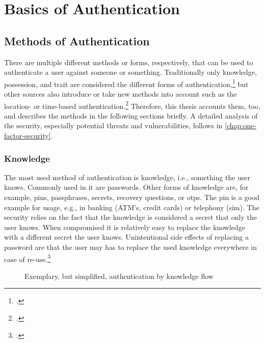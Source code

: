 \chapter{Basics of Authentication}
\label{chapter:basics}

\section{Methods of Authentication}
There are multiple different methods or forms, respectively, that can be used to authenticate a user against someone or something. Traditionally only knowledge, possession, and trait are considered the different forms of authentication,\footcites[See][299]{10.2307/27845364}[See][140]{brotherston2017defensive}[See][47]{anderson2008security} but other sources also introduce or take new methods into account such as the location- or time-based authentication.\footcites[See][]{6296127}[See][191]{dasgupta2017multi} Therefore, this thesis accounts them, too, and describes the methods in the following sections briefly. A detailed analysis of the security, especially potential threats and vulnerabilities, follows in \autoref{chap:one-factor-security}.

\subsection{Knowledge}

The most used method of authentication is knowledge, i.e., \frqq something the user knows\flqq{}. Commonly used in \gls{it} are passwords. Other forms of knowledge are, for example, \glspl{pin}, passphrases, secrets, recovery questions, or \glspl{otp}. The \gls{pin} is a good example for usage, e.g., in banking (ATM's, credit cards) or telephony (\gls{sim}). The security relies on the fact that the knowledge is considered a secret that only the user knows. When compromised it is relatively easy to replace the knowledge with a different secret the user knows. Unintentional side effects of replacing a password are that the user may has to replace the used knowledge everywhere in case of re-use.\footcite[See][467]{eckert-it-sec-9}

\newpage

\begin{figure}[hbt]
	\centering
	
	\caption[Exemplary, but simplified, authentication by knowledge flow]{Exemplary, but simplified, authentication by knowledge flow\footnotemark}
	\label{fig:knowledge_auth_flow}
\end{figure}

